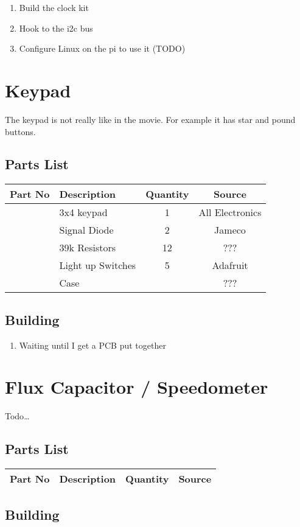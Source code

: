 \documentclass[11pt]{article}
\begin{document}
\begin{enumerate}
\item Build the clock kit
\item Hook to the i2c bus
\item Configure Linux on the pi to use it (TODO)
\end{enumerate}


\pagebreak
\section{Keypad}

The keypad is not really like in the movie.  For example
it has star and pound buttons.


\subsection{Parts List}

\begin{tabular}{|c|l|c|c|}
\hline
Part No	&  Description			&  Quantity	& Source \\
\hline
\hline
	& 3x4 keypad		& 1		& All Electronics \\
\hline
	& Signal Diode		& 2		& Jameco \\
\hline
	& 39k Resistors		& 12		& ??? \\

\hline
	& Light up Switches 	& 5		& Adafruit \\
\hline
	& Case			&		& ??? \\
\hline
\end{tabular}

\subsection{Building}

\begin{enumerate}
\item Waiting until I get a PCB put together
\end{enumerate}

\pagebreak
\section{Flux Capacitor / Speedometer}

Todo{\dots}

\subsection{Parts List}

\begin{tabular}{|c|l|c|c|}
\hline
Part No	&  Description			&  Quantity	& Source \\
\hline
\hline
\end{tabular}

\subsection{Building}
\end{document}
